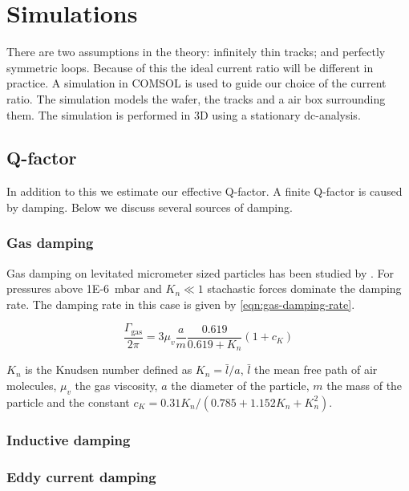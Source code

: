 \section{Simulations}
There are two assumptions in the theory: infinitely thin tracks; and perfectly symmetric loops. Because of this the ideal current ratio will be different in practice. A simulation in COMSOL is used to guide our choice of the current ratio. The simulation models the  wafer, the  tracks and a air box surrounding them. The simulation is performed in 3D using a stationary dc-analysis.

\subsection{Q-factor}
In addition to this we estimate our effective Q-factor. A finite Q-factor is caused by damping. Below we discuss several sources of damping.

\subsubsection{Gas damping}
Gas damping on levitated micrometer sized particles has been studied by \citeauthor{millen}. For pressures above \qty{1E-6}{\milli\bar} and $K_n \ll 1$ stachastic forces dominate the damping rate. The damping rate in this case is given by \autoref{eqn:gas-damping-rate}.

\begin{equation}
    \frac{\Gamma_{\text {gas}}}{2 \pi}=3 \mu_v \frac{a}{m} \frac{0.619}{0.619+K_n} \left( 1+c_K \right)
    \label{eqn:gas-damping-rate}
\end{equation}

$K_n$ is the Knudsen number defined as $K_n = \bar{l}/a$, $\bar{l}$ the mean free path of air molecules, $\mu_v$ the gas viscosity, $a$ the diameter of the particle, $m$ the mass of the particle and the constant $c_K = 0.31 K_n / \left(0.785 + 1.152 K_n + K_n^2 \right)$.

\subsubsection{Inductive damping}


\subsubsection{Eddy current damping}
